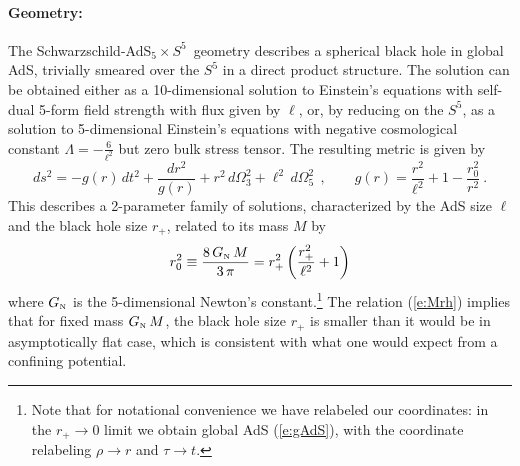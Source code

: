 \documentclass[12pt,a4paper]{article}
\def\req#1{(\ref{#1})}
\def\schw{Schwarzschild}
\def\GN{G_{\scriptscriptstyle {\rm N}}}
\def\adss#1#2{AdS$_{#1} \times S^{#2}$}
\def\Rads{\ell}
\def\rh{r_+}
\begin{document}
\paragraph{Geometry:}  %
The \schw-\adss55\  geometry describes a spherical black hole in global AdS, trivially smeared over the $S^5$ in a direct product structure.
The solution can be obtained either as a 10-dimensional solution to Einstein's equations with self-dual 5-form field strength with flux given by $\Rads$, or, by reducing on the $S^5$, as a solution to 5-dimensional Einstein's equations with negative cosmological constant $\Lambda = - \frac{6}{\Rads^2}$ but zero bulk stress tensor.
The resulting metric is given by
%
\begin{equation}
ds^2 = - g(r) \, dt^2 + \frac{dr^2}{g(r)} + r^2 \, d\Omega_3^2 + \Rads^2 \, d\Omega_5^2
 \ \ , \qquad
g(r) = \frac{r^2}{\Rads^2} +1 - \frac{r_0^2}{r^2} \ .
\label{e:SAdS}
\end{equation}	
%
This describes a 2-parameter family of solutions, characterized by the AdS size $\Rads$ and the black hole size $\rh$, related to its mass $M$ by
%
\begin{equation}
r_0^2 \equiv \frac{8 \, \GN \, M}{3\, \pi} 
= \rh^2 \left( \frac{\rh^2}{\Rads^2} +1 \right)
\label{e:Mrh}
\end{equation}	
%
 where $\GN$ is the 5-dimensional Newton's constant.\footnote{
 Note that for notational convenience we have relabeled our coordinates: in the $\rh \to 0 $ limit we obtain global AdS \req{e:gAdS}, with the coordinate relabeling $\rho \to r$ and $\tau \to t$.
 }
 The relation \req{e:Mrh} implies that for fixed mass $\GN \, M$, the  black hole size $\rh$ is smaller than it would be in asymptotically flat case, which is consistent with what one would expect from a confining potential.
 
\end{document}
